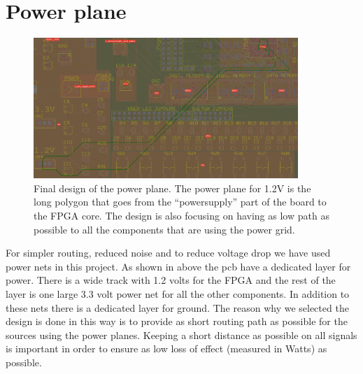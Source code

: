 \section {Power plane}

\begin{figure}
\centering
\includegraphics[width=10cm,keepaspectratio]{pcb/powerplanephoto.png}
\caption{Final design of the power plane. The power plane for 1.2V is the long polygon that goes from the ``powersupply'' part of the board to the FPGA core. The
design is also focusing on having as low path as possible to all the components that are using the power grid.  }
\label{figure:powerplanephoto}
\end{figure}

For simpler routing, reduced noise and to reduce voltage drop we have used power nets in this project.
As shown in above the pcb have a dedicated layer for power.
There is a wide track with 1.2 volts for the FPGA and the rest of the layer is one large 3.3 volt power net for all the other components.
In addition to these nets there is a dedicated layer for ground. The reason why we selected the design is done in this way is to provide as short routing path as possible for the sources using the power planes.
Keeping a short distance as possible on all signals is important in order to ensure as low loss of effect (measured in Watts) as possible.

